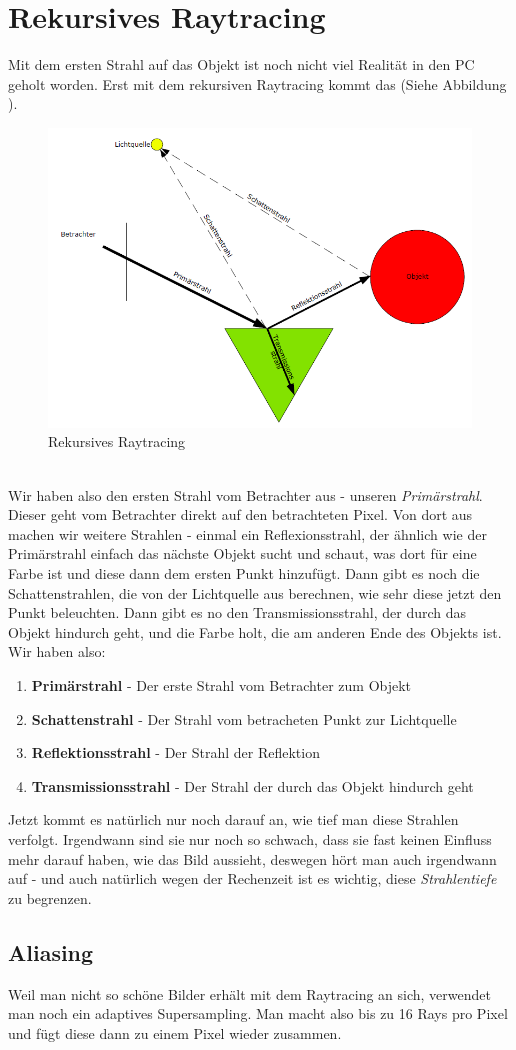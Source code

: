 \section{Rekursives Raytracing}
Mit dem ersten Strahl auf das Objekt ist noch nicht viel Realität in den PC geholt worden. Erst mit dem rekursiven Raytracing kommt das (Siehe Abbildung \label{fig:raytracing_rekursiv}).
\begin{figure}[!ht]
	\centering
	\includegraphics[width=0.8\linewidth]{fig/raytracing_rekursiv}
	\caption{Rekursives Raytracing}
	\label{fig:raytracing_rekursiv}
\end{figure}\\
Wir haben also den ersten Strahl vom Betrachter aus - unseren \textit{Primärstrahl}. Dieser geht vom Betrachter direkt auf den betrachteten Pixel. Von dort aus machen wir weitere Strahlen - einmal ein Reflexionsstrahl, der ähnlich wie der Primärstrahl einfach das nächste Objekt sucht und schaut, was dort für eine Farbe ist und diese dann dem ersten Punkt hinzufügt. Dann gibt es noch die Schattenstrahlen, die von der Lichtquelle aus berechnen, wie sehr diese jetzt den Punkt beleuchten. Dann gibt es no den Transmissionsstrahl, der durch das Objekt hindurch geht, und die Farbe holt, die am anderen Ende des Objekts ist. Wir haben also:
\begin{enumerate}
	\item \textbf{Primärstrahl} - Der erste Strahl vom Betrachter zum Objekt
	\item \textbf{Schattenstrahl} - Der Strahl vom betracheten Punkt zur Lichtquelle
	\item \textbf{Reflektionsstrahl} - Der Strahl der Reflektion
	\item \textbf{Transmissionsstrahl} - Der Strahl der durch das Objekt hindurch geht
\end{enumerate}
Jetzt kommt es natürlich nur noch darauf an, wie tief man diese Strahlen verfolgt. Irgendwann sind sie nur noch so schwach, dass sie fast keinen Einfluss mehr darauf haben, wie das Bild aussieht, deswegen hört man auch irgendwann auf - und auch natürlich wegen der Rechenzeit ist es wichtig, diese \textit{Strahlentiefe} zu begrenzen.

\subsection{Aliasing}
Weil man nicht so schöne Bilder erhält mit dem Raytracing an sich, verwendet man noch ein adaptives Supersampling. Man macht also bis zu 16 Rays pro Pixel und fügt diese dann zu einem Pixel wieder zusammen.